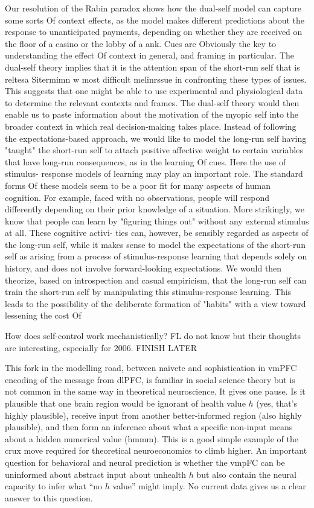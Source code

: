 \documentclass{article}
\begin{document}
Our resolution of the Rabin paradox shows how the dual-self model can capture some sorts Of context effects, as the model makes different
predictions about the response to unanticipated payments, depending on whether they are received on the floor of a casino or the lobby of a
ank. Cues are Obviously the key to understanding the effect Of context in general, and framing in particular. The dual-self theory implies that it
is the attention span of the short-run self that is reltesa Sitermimn w
most difficult melinrssue in confronting these types of issues. This
suggests that one might be able to use experimental and physiological data to determine the relevant contexts and frames. The dual-self theory would then enable us to paste information
about the motivation of the myopic self into the broader context in which real decision-making takes place.
Instead of following the expectations-based approach, we would like to model the long-run
self having "taught" the short-run self to attach positive affective weight to certain variables that have long-run consequences, as in the learning Of cues. Here the use of stimulus-
response models of learning may play an important role. The standard forms Of these models seem to be a poor fit for many aspects of human cognition. For example, faced with no
observations, people will respond differently depending on their prior knowledge of a situation. More strikingly, we know that people
can learn by "figuring things out" without any external stimulus at all. These cognitive activi-
ties can, however, be sensibly regarded as aspects of the long-run self, while it makes sense to model the expectations of the short-run self
as arising from a process of stimulus-response
learning that depends solely on history, and does not involve forward-looking expectations.
We would then theorize, based on introspection and casual empiricism, that the long-run self can train the short-run self by manipulating this
stimulus-response learning. This leads to the possibility of the deliberate formation of "habits" with a view toward lessening the cost Of
                
How does self-control work mechanistically?  FL do not know but their thoughts are interesting, especially for 2006. FINISH LATER 

This fork in the modelling road, between naivete and sophistication in vmPFC encoding of the message from dlPFC, is familiar in social science theory but is not common in the same way in theoretical neuroscience.  It gives one pause. Is it plausible that one brain region would be ignorant of health value $h$ (yes, that’s highly plausible), receive input from another better-informed region (also highly plausible), and then form an inference about what a specific non-input means about a hidden numerical value (hmmm). 
This is a good simple example of the crux move required for theoretical neuroeconomics to climb higher.  An important question for behavioral and neural prediction is whether the vmpFC can be uninformed about abstract input about unhealth $h$ but also contain the neural capacity to infer what “no $h$ value” might imply. No current data gives us a clear answer to this question. 
\end{document}
